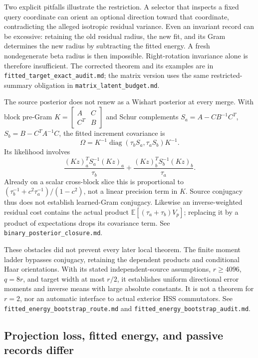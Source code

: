 \documentclass[11pt,oneside,openany,a4paper]{report}
\numberwithin{equation}{chapter}
\theoremstyle{definition}
\theoremstyle{remark}
\newcommand{\sourcefile}[1]{{\small\nolinkurl{#1}}}
\begin{document}
Two explicit pitfalls illustrate the restriction.  A selector that
inspects a fixed query coordinate can orient an optional direction
toward that coordinate, contradicting the alleged isotropic residual
variance.  Even an invariant record can be excessive: retaining the
old residual radius, the new fit, and its Gram determines the new
radius by subtracting the fitted energy.  A fresh nondegenerate beta
radius is then impossible.  Right-rotation invariance alone is
therefore insufficient.  The corrected theorem and its examples are
in \sourcefile{fitted_target_exact_audit.md}; the matrix version uses
the same restricted-summary obligation in
\sourcefile{matrix_latent_budget.md}.

The source posterior does not renew as a Wishart posterior at every
merge.  With block pre-Gram
$K=\left[\begin{smallmatrix}A&C\\C^T&B\end{smallmatrix}\right]$
and Schur complements $S_a=A-CB^{-1}C^T$,
$S_b=B-C^TA^{-1}C$, the fitted increment covariance is
\[
 \Omega=K^{-1}\operatorname{diag}(\tau_bS_a,\tau_aS_b)K^{-1}.
\]
Its likelihood involves
\[
 \frac{(Kz)_a^TS_a^{-1}(Kz)_a}{\tau_b}
 +\frac{(Kz)_b^TS_b^{-1}(Kz)_b}{\tau_a}.
\]
Already on a scalar cross-block slice this is proportional to
$(\tau_b^{-1}+c^2\tau_a^{-1})/(1-c^2)$, not a linear precision term
in $K$.  Source conjugacy thus does not establish learned-Gram
conjugacy.  Likewise an inverse-weighted residual cost contains the
actual product $\mathbb E[(\tau_a+\tau_b)V_p]$; replacing it by a
product of expectations drops its covariance term.
See \sourcefile{binary_posterior_closure.md}.

These obstacles did not prevent every later local theorem.  The finite
moment ladder bypasses conjugacy, retaining the dependent products and
conditional Haar orientations.  With its stated independent-source
assumptions, $r\ge4096$, $q=8r$, and target width at most $r/2$, it
establishes uniform directional error moments and inverse means with
large absolute constants.  It is not a theorem for $r=2$, nor an
automatic interface to actual exterior HSS commutators.
See \sourcefile{fitted_energy_bootstrap_route.md} and
\sourcefile{fitted_energy_bootstrap_audit.md}.

\subsection{Projection loss, fitted energy, and passive records differ}
\end{document}
